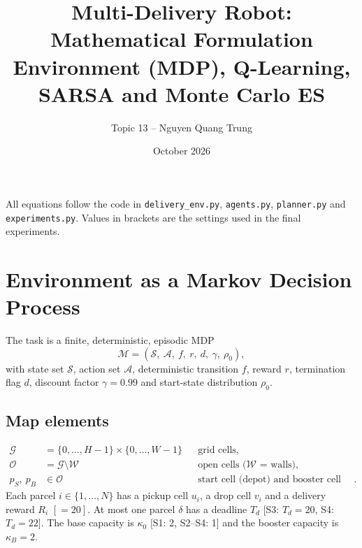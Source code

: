 \documentclass[11pt]{article}
\title{Multi-Delivery Robot: Mathematical Formulation\\[2pt]
\large Environment (MDP), Q-Learning, SARSA and Monte Carlo ES}
\author{Topic 13 -- Nguyen Quang Trung}
\date{October 2026}
\newcommand{\Sset}{\mathcal{S}}
\newcommand{\Aset}{\mathcal{A}}
\newcommand{\Open}{\mathcal{O}}
\newcommand{\Walls}{\mathcal{W}}
\newcommand{\Grid}{\mathcal{G}}
\begin{document}
\maketitle

\noindent All equations follow the code in \texttt{delivery\_env.py}, \texttt{agents.py}, \texttt{planner.py} and \texttt{experiments.py}. Values in brackets are the settings used in the final experiments.

\section{Environment as a Markov Decision Process}
The task is a finite, deterministic, episodic MDP
\begin{equation}
\mathcal{M}=(\Sset,\ \Aset,\ f,\ r,\ d,\ \gamma,\ \rho_0),
\end{equation}
with state set $\Sset$, action set $\Aset$, deterministic transition $f$, reward $r$, termination flag $d$, discount factor $\gamma=0.99$ and start-state distribution $\rho_0$.

\subsection{Map elements}
\begin{align}
\Grid &= \{0,\dots,H-1\}\times\{0,\dots,W-1\} && \text{grid cells},\\
\Open &= \Grid\setminus\Walls && \text{open cells ($\Walls$ = walls)},\\
p_S,\ p_B &\in \Open && \text{start cell (depot) and booster cell (S4 only)}.
\end{align}
Each parcel $i\in\{1,\dots,N\}$ has a pickup cell $u_i$, a drop cell $v_i$ and a delivery reward $R_i$ $[=20]$. At most one parcel $\delta$ has a deadline $T_d$ $[$S3: $T_d=20$, S4: $T_d=22]$. The base capacity is $\kappa_0$ $[$S1: 2, S2--S4: 1$]$ and the booster capacity is $\kappa_B=2$.
\end{document}
